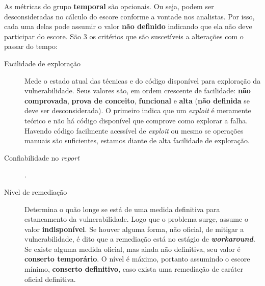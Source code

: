 			As métricas do grupo \textbf{temporal} são opcionais. Ou seja, podem ser
			desconsideradas no cálculo do escore conforme a vontade nos analistas.
			Por isso, cada uma delas pode assumir o valor \textbf{não definido} indicando
			que ela não deve participar do escore.
			São 3 os critérios que são suscetíveis a alterações com o passar do tempo:
			\begin{description}
				\item[Facilidade de exploração]{Mede o estado atual das técnicas
					e do código disponível para exploração da vulnerabilidade.
					Seus valores são, em ordem crescente de facilidade: 
					\textbf{não comprovada},  \textbf{prova de conceito},
					\textbf{funcional} e \textbf{alta}
					(\textbf{não definida} se deve ser desconsiderada).
					O primeiro indica que um \textsl{exploit} é meramente teórico
					e não há código disponível que comprove como explorar a falha.
					Havendo código facilmente acessível de \textsl{exploit}
					ou mesmo se operações manuais são suficientes, estamos
					diante de alta facilidade de exploração.}
				\item[Confiabilidade no \textsl{report}]{.}
				\item[Nível de remediação]{Determina o quão longe se está de uma medida
					definitiva para estancamento da vulnerabilidade.
					Logo que o problema surge, assume o valor \textbf{indisponível}.
					Se houver alguma forma, não oficial, de mitigar a vulnerabilidade,
					é dito que a remediação está no estágio de 	\textbf{\textsl{workaround}}.
					Se existe alguma medida oficial, mas ainda não definitiva, 
					seu valor é \textbf{conserto temporário}. O nível é máximo,
					portanto assumindo o escore mínimo,
					\textbf{conserto definitivo}, caso exista uma remediação de caráter
					oficial definitiva.}
			\end{description}



